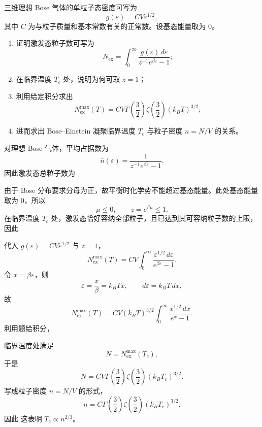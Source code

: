 \begin{question}
三维理想 Bose 气体的单粒子态密度可写为
\[
g(\varepsilon)=C V \varepsilon^{1/2},
\]
其中 $C$ 为与粒子质量和基本常数有关的正常数。设基态能量取为 $0$。

\begin{enumerate}[label=(\arabic*),leftmargin=2.5em]
  \item 证明激发态粒子数可写为
  \[
  N_{\mathrm{ex}}
  =
  \int_0^\infty \frac{g(\varepsilon)\,d\varepsilon}{z^{-1}e^{\beta\varepsilon}-1};
  \]
  \item 在临界温度 $T_c$ 处，说明为何可取 $z=1$；
  \item 利用给定积分求出
  \[
  N_{\mathrm{ex}}^{\max}(T)
  =
  C V \Gamma\!\left(\frac32\right)\zeta\!\left(\frac32\right)(k_B T)^{3/2};
  \]
  \item 进而求出 Bose--Einstein 凝聚临界温度 $T_c$ 与粒子密度 $n=N/V$ 的关系。
\end{enumerate}

\begin{solution}
对理想 Bose 气体，平均占据数为
\[
\bar n(\varepsilon)=\frac{1}{z^{-1}e^{\beta\varepsilon}-1}.
\]
因此激发态总粒子数为

由于 Bose 分布要求分母为正，故平衡时化学势不能超过基态能量。此处基态能量取为 $0$，所以
\[
\mu\le 0,\qquad z=e^{\beta\mu}\le 1.
\]
在临界温度 $T_c$ 处，激发态恰好容纳全部粒子，且已达到其可容纳粒子数的上限，因此

代入 $g(\varepsilon)=CV\varepsilon^{1/2}$ 与 $z=1$，
\[
N_{\mathrm{ex}}^{\max}(T)
=
CV\int_0^\infty \frac{\varepsilon^{1/2}\,d\varepsilon}{e^{\beta\varepsilon}-1}.
\]
令 $x=\beta\varepsilon$，则
\[
\varepsilon=\frac{x}{\beta}=k_BTx,\qquad d\varepsilon=k_B T\,dx,
\]
故
\[
N_{\mathrm{ex}}^{\max}(T)
=
CV(k_B T)^{3/2}\int_0^\infty \frac{x^{1/2}\,dx}{e^x-1}.
\]
利用题给积分，

临界温度处满足
\[
N=N_{\mathrm{ex}}^{\max}(T_c),
\]
于是
\[
N=CV\Gamma\!\left(\frac32\right)\zeta\!\left(\frac32\right)(k_B T_c)^{3/2}.
\]
写成粒子密度 $n=N/V$ 的形式，
\[
n=C\Gamma\!\left(\frac32\right)\zeta\!\left(\frac32\right)(k_B T_c)^{3/2}.
\]
因此
这表明 $T_c\propto n^{2/3}$。
\end{solution}
\end{question}
